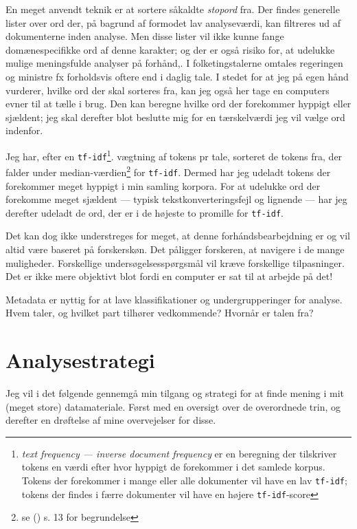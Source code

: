 En meget anvendt teknik er at sortere såkaldte \textit{stopord} fra.
Der findes generelle lister over ord der, på bagrund af formodet lav analyseværdi, kan filtreres ud af dokumenterne inden analyse.
Men disse lister vil ikke kunne fange domænespecifikke ord af denne karakter; og der er også risiko for, at udelukke mulige meningsfulde analyser på forhånd,\autocite[s. 27]{manningIntroductionInformationRetrieval2008}.
I folketingstalerne omtales regeringen og ministre fx forholdsvis oftere end i daglig tale.
I stedet for at jeg på egen hånd vurderer, hvilke ord der skal sorteres fra, kan jeg også her tage en computers evner til at tælle i brug.
Den kan beregne hvilke ord der forekommer hyppigt eller sjældent; jeg skal derefter blot beslutte mig for en tærskelværdi jeg vil vælge ord indenfor.

Jeg har, efter en \texttt{tf-idf}\footnote{\textit{text frequency — inverse document frequency} er en beregning der tilskriver tokens en værdi efter hvor hyppigt de forekommer i det samlede korpus.
Tokens der forekommer i mange eller alle dokumenter vil have en lav \texttt{tf-idf}; tokens der findes i færre dokumenter vil have en højere \texttt{tf-idf}-score}. vægtning af tokens pr tale, sorteret de tokens fra, der falder under median-værdien\footnote{se \citeauthor{grunTopicmodelsPackageFitting2011} (\citeyear{grunTopicmodelsPackageFitting2011}) s. 13 for begrundelse} for \texttt{tf-idf}.
Dermed har jeg udeladt tokens der forekommer meget hyppigt i min samling korpora.
For at udelukke ord der forekomme meget sjældent — typisk tekstkonverteringsfejl og lignende — har jeg derefter udeladt de ord, der er i de højeste to promille for \texttt{tf-idf}.


Det kan dog ikke understreges for meget, at denne forhándsbearbejdning er og vil altid være baseret på forskerskøn.
Det påligger forskeren, at navigere i de mange muligheder.
Forskellige undersøgelsesspørgsmål vil kræve forskellige tilpasninger.
Det er ikke mere objektivt blot fordi en computer er sat til at arbejde på det!

Metadata er nyttig for at lave klassifikationer og undergrupperinger for analyse.
Hvem taler, og hvilket part tilhører vedkommende?
Hvornår er talen fra?


\chapter{Analysestrategi}\label{chap:strategy}

Jeg vil i det følgende gennemgå min tilgang og strategi for at finde mening i mit (meget store) datamateriale.
Først med en oversigt over de overordnede trin, og derefter en drøftelse af mine overvejelser for disse. 

